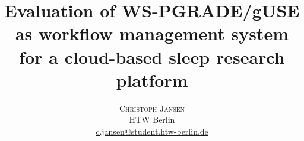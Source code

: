 \documentclass[twoside]{article}
\title{\vspace{-15mm}%
	\fontsize{24pt}{10pt}\selectfont
	\textbf{Evaluation of WS-PGRADE/gUSE as workflow management system for a cloud-based sleep research platform}
	}
\author{%
	\large
	\textsc{Christoph Jansen} \\[2mm]
	\normalsize	HTW Berlin \\
	\normalsize	\href{mailto:c.jansen@student.htw-berlin.de}{c.jansen@student.htw-berlin.de}
	\vspace{-5mm}
	}
\date{}
\begin{document}
\maketitle
\thispagestyle{fancy}


	

\begin{multicols}{2}



















\end{multicols}
\end{document}
